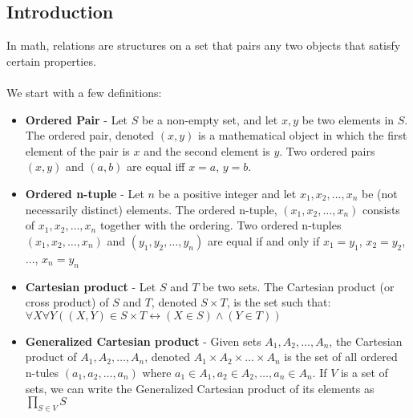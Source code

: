 \documentclass[a4paper]{article}
\begin{document}
\subsection{Introduction}
In math, relations are structures on a set that pairs any two objects that satisfy certain properties.\\ \\
We start with a few definitions:
\begin{itemize}
	\item \textbf{Ordered Pair} - Let $S$ be a non-empty set, and let $x,y$ be two elements in $S$. The ordered pair, denoted $(x,y)$ is a mathematical object in which the first element of the pair is $x$ and the second element is $y$. Two ordered pairs $(x,y)$ and $(a,b)$ are equal iff $x=a$, $y=b$.
	\item \textbf{Ordered n-tuple} - Let $n$ be a positive integer and let $x_1, x_2, \dots, x_n$ be (not necessarily distinct) elements. The ordered n-tuple, $(x_1, x_2, \dots, x_n)$ consists of $x_1, x_2,\dots, x_n$ together with the ordering. Two ordered n-tuples $(x_1, x_2, \dots, x_n)$ and $(y_1, y_2, \dots, y_n)$ are equal if and only if $x_1 = y_1$, $x_2 = y_2$, $\dots$, $x_n = y_n$
	\item \textbf{Cartesian product} - Let $S$ and $T$ be two sets. The Cartesian product (or cross product) of $S$ and $T$, denoted $S \times T$, is the set such that: $\forall X \forall Y ((X,Y) \in S \times T \leftrightarrow (X\in S) \land (Y\in T))$
	\item \textbf{Generalized Cartesian product} - Given sets $A_1, A_2, \dots, A_n$, the Cartesian product of $A_1, A_2, \dots, A_n$, denoted $A_1 \times A_2 \times \dots \times A_n$ is the set of all ordered n-tules $(a_1,a_2,\dots,a_n)$ where $a_1\in A_1, a_2\in A_2,\dots,a_n\in A_n$. If $V$ is a set of sets, we can write the Generalized Cartesian product of its elements as $\prod\limits_{S\in V}S$
\end{itemize}
\end{document}
